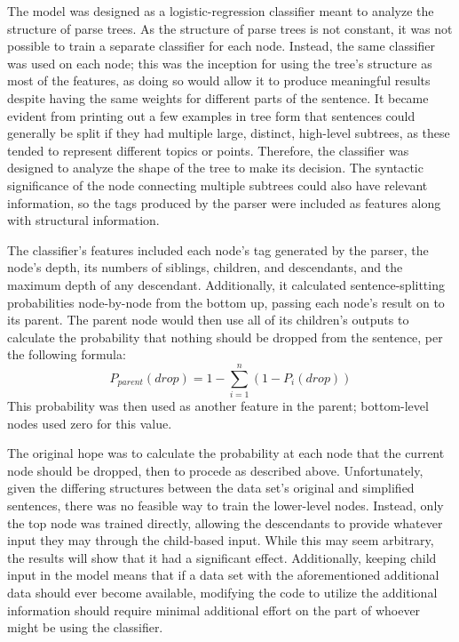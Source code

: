 \documentclass{article}
\begin{document}
The model was designed as a logistic-regression classifier meant to analyze the structure of parse trees. As the structure of parse trees is not constant, it was not possible to train a separate classifier for each node. Instead, the same classifier was used on each node; this was the inception for using the tree's structure as most of the features, as doing so would allow it to produce meaningful results despite having the same weights for different parts of the sentence. It became evident from printing out a few examples in tree form that sentences could generally be split if they had multiple large, distinct, high-level subtrees, as these tended to represent different topics or points. Therefore, the classifier was designed to analyze the shape of the tree to make its decision. The syntactic significance of the node connecting multiple subtrees could also have relevant information, so the tags produced by the parser were included as features along with structural information.

The classifier's features included each node's tag generated by the parser, the node's depth, its numbers of siblings, children, and descendants, and the maximum depth of any descendant. Additionally, it calculated sentence-splitting probabilities node-by-node from the bottom up, passing each node's result on to its parent. The parent node would then use all of its children's outputs to calculate the probability that nothing should be dropped from the sentence, per the following formula:
\[P_{parent}(drop) = 1 - \sum_{i=1}^{n}\left(1 - P_{i}(drop)\right)\]
This probability was then used as another feature in the parent; bottom-level nodes used zero for this value.

The original hope was to calculate the probability at each node that the current node should be dropped, then to procede as described above. Unfortunately, given the differing structures between the data set's original and simplified sentences, there was no feasible way to train the lower-level nodes. Instead, only the top node was trained directly, allowing the descendants to provide whatever input they may through the child-based input. While this may seem arbitrary, the results will show that it had a significant effect. Additionally, keeping child input in the model means that if a data set with the aforementioned additional data should ever become available, modifying the code to utilize the additional information should require minimal additional effort on the part of whoever might be using the classifier.
\end{document}
